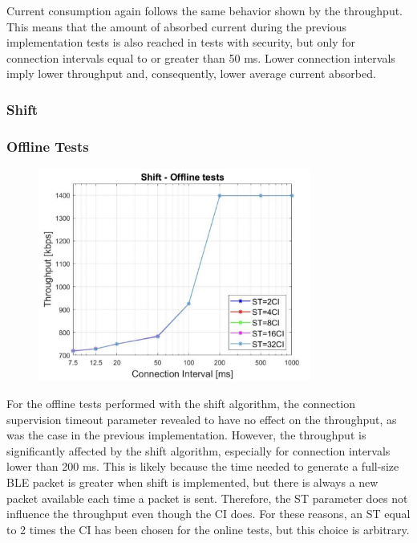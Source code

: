 \documentclass{Configuration_Files/PoliMi3i_thesis}
\begin{document}
Current consumption again follows the same behavior shown by the throughput. This means that the amount of absorbed current during the previous implementation tests is also reached in tests with security, but only for connection intervals equal to or greater than 50 ms. Lower connection intervals imply lower throughput and, consequently, lower average current absorbed.

\subsubsection*{Shift}

\subsubsection*{Offline Tests}

\begin{figure}[h!]
    \centering
    \includegraphics[width=0.8\textwidth]{Results Manuel/figure14}
    \label{fig:figure1}
\end{figure}


For the offline tests performed with the shift algorithm, the connection supervision timeout parameter revealed to have no effect on the throughput, as was the case in the previous implementation. However, the throughput is significantly affected by the shift algorithm, especially for connection intervals lower than 200 ms. This is likely because the time needed to generate a full-size BLE packet is greater when shift is implemented, but there is always a new packet available each time a packet is sent. Therefore, the ST parameter does not influence the throughput even though the CI does. For these reasons, an ST equal to 2 times the CI has been chosen for the online tests, but this choice is arbitrary.
\end{document}
